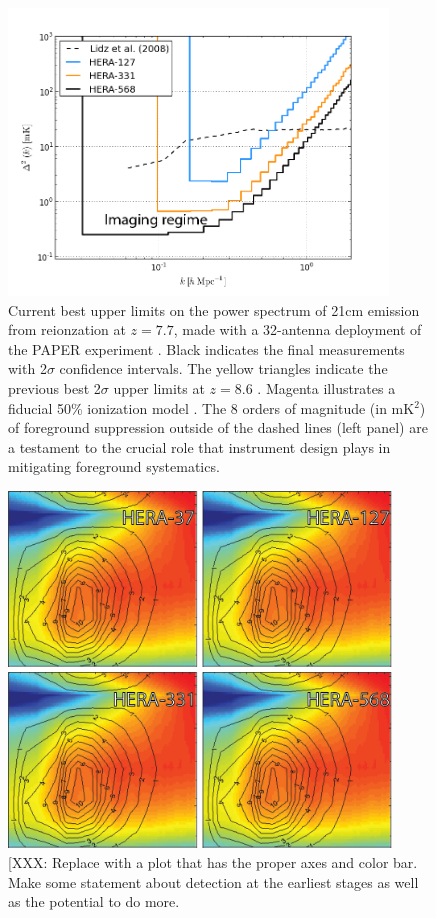 \documentclass[preprint]{aastex}
\begin{document}
\begin{figure}[!ht]\centering
\includegraphics[height=3.0in]{plots/eor_pspec.png}
\caption{\small
Current best upper limits on the power spectrum of 21cm emission from
reionzation at $z=7.7$, made with a 32-antenna deployment of the PAPER
experiment \citep{parsons_et_al2013}. Black indicates the final measurements
with 2$\sigma$ confidence intervals. The yellow triangles indicate the previous
best 2$\sigma$ upper limits at $z=8.6$ \citep{paciga_et_al2013}. Magenta
illustrates a fiducial 50\% ionization model \citep{lidz_et_al2008}. The 8
orders of magnitude (in mK$^2$) of foreground suppression outside of the dashed
lines (left panel) are a testament to the crucial role that instrument design
plays in mitigating foreground systematics.
}\label{fig:eor_pspec}
\end{figure}

\begin{figure}[!ht]\centering
\includegraphics[width=4in]{plots/FourPanContour.png}
\caption{\small
[XXX: Replace with a plot that has the proper axes and color bar.  Make some statement
about detection at the earliest stages as well as the potential to do more.
}\label{fig:FourPanContour}
\end{figure}
\end{document}
